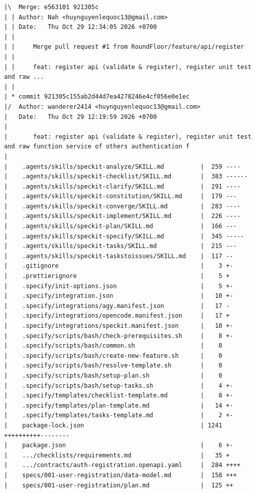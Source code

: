 \documentclass[12pt]{article}
\begin{document}
\begin{lstlisting}[numbers=none,breaklines=true]
|\  Merge: e563101 921305c
| | Author: Nah <huynguyenlequoc13@gmail.com>
| | Date:   Thu Oct 29 12:34:05 2026 +0700
| |
| |     Merge pull request #1 from RoundFloor/feature/api/register
| |
| |     feat: register api (validate & register), register unit test and raw ...
| |
| * commit 921305c155ab2d44d7ea4278246e4cf056e0e1ec
|/  Author: wanderer2414 <huynguyenlequoc13@gmail.com>
|   Date:   Thu Oct 29 12:19:59 2026 +0700
|
|       feat: register api (validate & register), register unit test and raw function service of others authentication f
|
|    .agents/skills/speckit-analyze/SKILL.md          |  259 ----
|    .agents/skills/speckit-checklist/SKILL.md        |  383 ------
|    .agents/skills/speckit-clarify/SKILL.md          |  291 ----
|    .agents/skills/speckit-constitution/SKILL.md     |  179 ---
|    .agents/skills/speckit-converge/SKILL.md         |  283 ----
|    .agents/skills/speckit-implement/SKILL.md        |  226 ----
|    .agents/skills/speckit-plan/SKILL.md             |  166 ---
|    .agents/skills/speckit-specify/SKILL.md          |  345 -----
|    .agents/skills/speckit-tasks/SKILL.md            |  215 ---
|    .agents/skills/speckit-taskstoissues/SKILL.md    |  117 --
|    .gitignore                                       |    3 +-
|    .prettierignore                                  |    5 +
|    .specify/init-options.json                       |    5 +-
|    .specify/integration.json                        |   10 +-
|    .specify/integrations/agy.manifest.json          |   17 -
|    .specify/integrations/opencode.manifest.json     |   17 +
|    .specify/integrations/speckit.manifest.json      |   10 +-
|    .specify/scripts/bash/check-prerequisites.sh     |    8 +-
|    .specify/scripts/bash/common.sh                  |    0
|    .specify/scripts/bash/create-new-feature.sh      |    0
|    .specify/scripts/bash/resolve-template.sh        |    0
|    .specify/scripts/bash/setup-plan.sh              |    0
|    .specify/scripts/bash/setup-tasks.sh             |    4 +-
|    .specify/templates/checklist-template.md         |    8 +-
|    .specify/templates/plan-template.md              |   14 +-
|    .specify/templates/tasks-template.md             |    2 +-
|    package-lock.json                                | 1241 ++++++++++--------
|    package.json                                     |    6 +-
|    .../checklists/requirements.md                   |   35 +
|    .../contracts/auth-registration.openapi.yaml     |  284 ++++
|    specs/001-user-registration/data-model.md        |  158 +++
|    specs/001-user-registration/plan.md              |  125 ++

\end{lstlisting}
\end{document}
